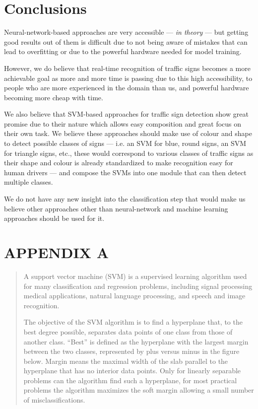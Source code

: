 \documentclass[conference]{IEEEtran}
\begin{document}
\section{Conclusions}

Neural-network-based approaches are very accessible --- \emph{in theory} --- but getting good
results out of them is difficult due to not being aware of mistakes that can lead to overfitting
or due to the powerful hardware needed for model training.

However, we do believe that real-time recognition of traffic signs becomes a more achievable goal
as more and more time is passing due to this high accessibility, to people who are more experienced
in the domain than us, and powerful hardware becoming more cheap with time.

We also believe that SVM-based approaches for traffic sign detection show great promise due to their nature
which allows easy composition and great focus on their own task. We believe these approaches should make use
of colour and shape to detect possible classes of signs --- i.e. an SVM for blue, round signs, an SVM for
triangle signs, etc., these would correspond to various classes of traffic signs as their shape and colour is
already standardized to make recognition easy for human drivers --- and compose the SVMs into one module that
can then detect multiple classes.

We do not have any new insight into the classification step that would make us believe other approaches other
than neural-network and machine learning approaches should be used for it.

\section*{APPENDIX A}\label{appendixa}
\blockcquote[Support Vector Machine (SVM) Explained - MATLAB \& Simulink]{matlabsvm}{
A support vector machine (SVM) is a supervised learning algorithm used for many classification and regression problems, including signal processing  medical applications, natural language processing, and speech and image recognition.

The objective of the SVM algorithm is to find a hyperplane that, to the best degree possible, separates data points of one class from those of another class. “Best” is defined as the hyperplane with the largest margin between the two classes, represented by plus versus minus in the figure below. Margin means the maximal width of the slab parallel to the hyperplane that has no interior data points. Only for linearly separable problems can the algorithm find such a hyperplane, for most practical problems the algorithm maximizes the soft margin allowing a small number of misclassifications.
}
\end{document}

